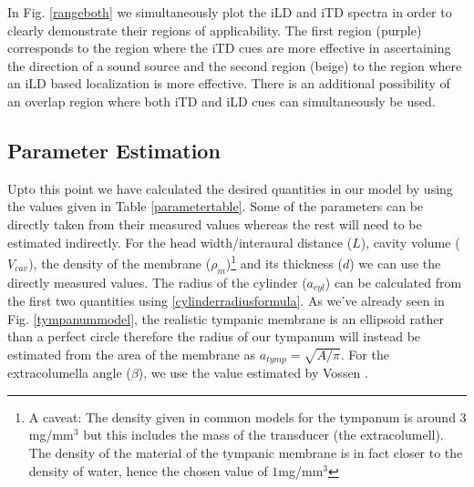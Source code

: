 In Fig. \ref{rangeboth} we simultaneously plot the iLD and iTD spectra in order to clearly demonstrate their regions of applicability. The first
region (purple) corresponds to the region where the iTD cues are more effective in ascertaining the direction of a sound source and the second
region (beige) to the region where an iLD based localization is more effective. There is an additional possibility of an overlap region where
both iTD and iLD cues can simultaneously be used.


% 
% 

\subsection{Parameter Estimation}\label{parameterestimation}
Upto this point we have calculated the desired quantities in our model by using the values given in Table \ref{parametertable}.
Some of the parameters can be directly taken from their measured values whereas
the rest will need to be estimated indirectly. 
For the head width/interaural distance ($L$), cavity volume ($V_{cav}$), the density of the membrane ($\rho_m$)\footnote{A caveat: The density given in common models for the tympanum
is around $3$mg/mm$^3$ but this includes the mass of the transducer (the extracolumell). The density of the material of the tympanic membrane is in fact closer to the density of water,
hence the chosen value of $1$mg/mm$^3$} and its thickness ($d$)
we can use the directly measured values. The radius of the cylinder ($a_{cyl}$) can be calculated from the first two quantities
using \eqref{cylinderradiusformula}. 
As we've already seen in Fig. \ref{tympanummodel}, the realistic tympanic membrane is an ellipsoid rather than a perfect circle therefore the radius of our tympanum will
instead be estimated from the area of the membrane as $a_{tymp}=\sqrt{A/\pi}$. For the extracolumella angle ($\beta$), we use the value estimated by Vossen \cite{vossenjasa}.

